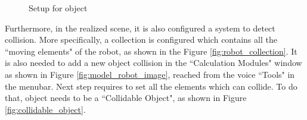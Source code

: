 \begin{figure}[h]
\centering
{}
\qquad
{}
\caption{Setup for object}
\label{collision_setup}
\end{figure}

Furthermore, in the realized scene, it is also configured a system to detect collision. More specifically, a collection is configured which contains all the ``moving elements" of the robot, as shown in the Figure \ref{fig:robot_collection}. It is also needed to add a new object collision in the ``Calculation Modules" window as shown in Figure \ref{fig:model_robot_image}, reached from the voice ``Tools" in the menubar. Next step requires to set all the elements which can collide. To do that, object needs to be a ``Collidable Object", as shown in Figure \ref{fig:collidable_object}.

